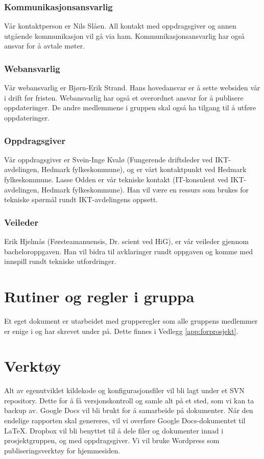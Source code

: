 \subsubsection{Kommunikasjonsansvarlig}
Vår kontaktperson er Nils Slåen. All kontakt med oppdragsgiver og annen utgående kommunikasjon vil gå via ham. Kommunikasjonsansvarlig har også ansvar for å avtale møter.

\subsubsection{Webansvarlig}
Vår webansvarlig er Bjørn-Erik Strand. Hans hovedansvar er å sette websiden vår i drift før fristen. Webansvarlig har også et overordnet ansvar for å publisere oppdateringer. De andre medlemmene i gruppen skal også ha tilgang til å utføre oppdateringer.

\subsubsection{Oppdragsgiver}
Vår oppdragsgiver er Svein-Inge Kvalø (Fungerende driftsleder ved IKT-avdelingen, Hedmark fylkeskommune), og er vårt kontaktpunkt ved Hedmark fylkeskommune. Lasse Odden er vår tekniske kontakt (IT-konsulent ved IKT-avdelingen, Hedmark fylkeskommune). Han vil være en ressurs som brukes for tekniske spørmål rundt IKT-avdelingens oppsett.

\subsubsection{Veileder}
Erik Hjelmås (Førsteamanuensis, Dr. scient ved HiG), er vår veileder gjennom bacheloroppgaven. Han vil bidra til avklaringer rundt oppgaven og komme med innspill rundt tekniske utfordringer.

\section{Rutiner og regler i gruppa}
Et eget dokument er utarbeidet med grupperegler som alle gruppens medlemmer er enige i og har skrevet under på. Dette finnes i Vedlegg \ref{app:forprosjekt}.

\section{Verktøy}
Alt av egenutviklet kildekode og konfigurasjonsfiler vil bli lagt under et SVN repository. Dette for å få versjonskontroll og samle alt på et sted, som vi kan ta backup av. Google Docs vil bli brukt for å samarbeide på dokumenter. Når den endelige rapporten skal genereres, vil vi overføre Google Docs-dokumentet til \LaTeX. Dropbox vil bli benyttet til å dele filer og dokumenter innad i prosjektgruppen, og med oppdragsgiver. Vi vil bruke Wordpress som publiseringsverktøy for hjemmesiden.

